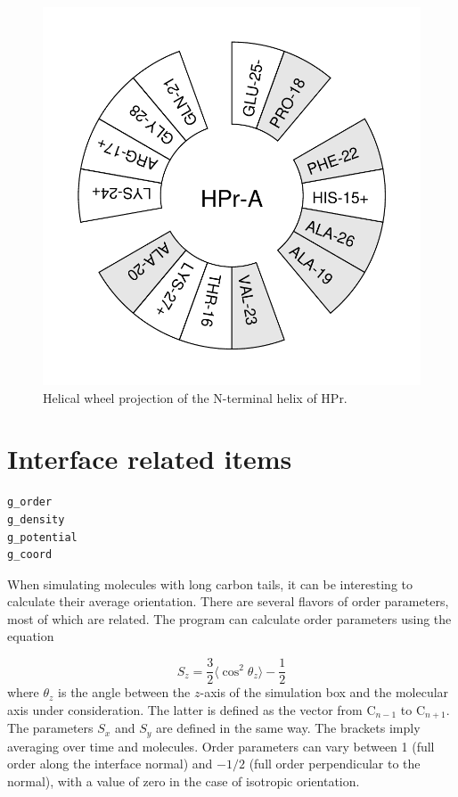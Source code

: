 {\begin{figure}
\centerline{\includegraphics[width=\htw]{plots/hpr-wheel}}
\caption{Helical wheel projection of the N-terminal helix of HPr.}
\label{fig:wheel}
\end{figure}


\section{Interface related items}
\begin{verbatim}
g_order
g_density
g_potential
g_coord
\end{verbatim}

When simulating molecules with long carbon tails, it can be
interesting to calculate their average orientation. There are several
flavors of order parameters, most of which are related. The program
{\tt {}} can calculate order parameters using the equation

\begin{equation}
S_{z} = \frac{3}{2}\langle {\cos^2{\theta_z}} \rangle - \frac{1}{2}
\label{eqn:Sgr}
\end{equation}
where $\theta_z$ is the angle between the $z$-axis of the simulation
box and the molecular axis under consideration. The latter is defined as the
vector from C$_{n-1}$ to C$_{n+1}$. The parameters $S_x$
and $S_y$ are defined in the same way. The brackets imply averaging over time
and molecules. Order parameters can vary between 1 (full order along
the interface normal) and $-1/2$ (full order perpendicular to the
normal), with a value of zero in the case of isotropic orientation.

}
